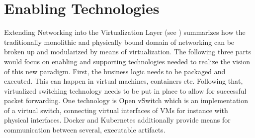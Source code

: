 




\section{Enabling Technologies}
Extending Networking into the Virtualization Layer (see \cite{pfaff2009extending}) summarizes how the traditionally monolithic and physically bound domain of networking can be broken up and modularized by means of virtualization. The following three parts would focus on enabling and supporting technologies needed to realize the vision of this new paradigm. First, the business logic needs to be packaged and executed. This can happen in virtual machines, containers etc. Following that, virtualized switching technology needs to be put in place to allow for successful packet forwarding. One technology is Open vSwitch which is an implementation of a virtual switch, connecting virtual interfaces of VMs for instance with physical interfaces. Docker and Kubernetes additionally provide means for communication between several, executable artifacts.


\quad










